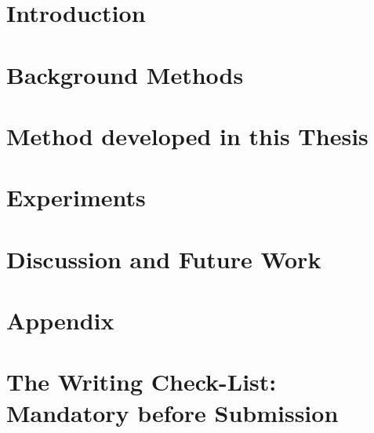 \documentclass[11pt,twoside]{report}
\begin{document}
	
	\chapter{Introduction}
	
	
	\chapter{Background Methods}
	
	\chapter{Method developed in this Thesis}
	
	\chapter{Experiments}
	
	
	
	
	\chapter{Discussion and Future Work}
	
	
	\clearpage
	\printbibliography  
	
	\appendix
	\chapter{Appendix}
	
	\chapter{The Writing Check-List: Mandatory before Submission}
	

 	
 	\clearpage
	
	
\end{document}
